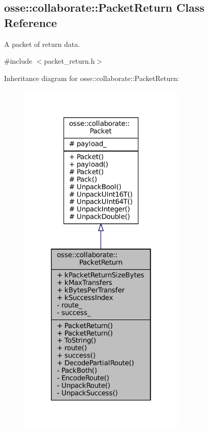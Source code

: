 \hypertarget{classosse_1_1collaborate_1_1_packet_return}{}\subsection{osse\+:\+:collaborate\+:\+:Packet\+Return Class Reference}
\label{classosse_1_1collaborate_1_1_packet_return}


A packet of return data.  




{\ttfamily \#include $<$packet\+\_\+return.\+h$>$}



Inheritance diagram for osse\+:\+:collaborate\+:\+:Packet\+Return\+:
\nopagebreak
\begin{figure}[H]
\begin{center}
\leavevmode
\includegraphics[width=226pt]{classosse_1_1collaborate_1_1_packet_return__inherit__graph}
\end{center}
\end{figure}
